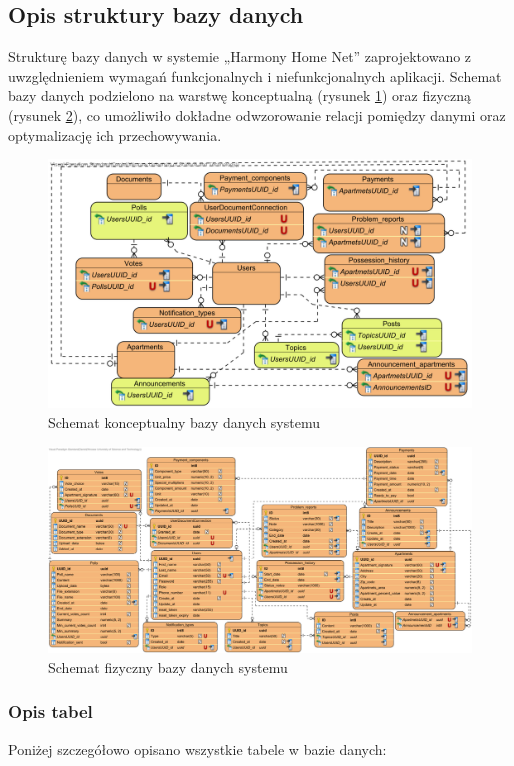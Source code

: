 \subsection{Opis struktury bazy danych}

Strukturę bazy danych w systemie „Harmony Home Net” zaprojektowano z uwzględnieniem wymagań funkcjonalnych i niefunkcjonalnych aplikacji. Schemat bazy danych podzielono na warstwę konceptualną (rysunek \ref{fig:ebok_db_concept}) oraz fizyczną (rysunek \ref{fig:ebok_db_physical}), co umożliwiło dokładne odwzorowanie relacji pomiędzy danymi oraz optymalizację ich przechowywania.
\begin{figure}[ht]
    \centering
    \includegraphics[width=.9\linewidth]{rys03/ebok_db_concept}
    \caption{Schemat konceptualny bazy danych systemu}
    \label{fig:ebok_db_concept}
\end{figure}
\begin{figure}[ht]
    \centering
    \includegraphics[width=1\linewidth]{rys03/ebok_db_physical}
		\caption{Schemat fizyczny bazy danych systemu}
    \label{fig:ebok_db_physical}
\end{figure}

\subsubsection{Opis tabel}
Poniżej szczegółowo opisano wszystkie tabele w bazie danych:

